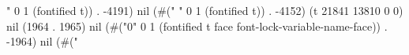 " 0 1 (fontified t)) . -4191) nil (#("
" 0 1 (fontified t)) . -4152) (t 21841 13810 0 0) nil (1964 . 1965) nil (#("0" 0 1 (fontified t face font-lock-variable-name-face)) . -1964) nil (#("%
